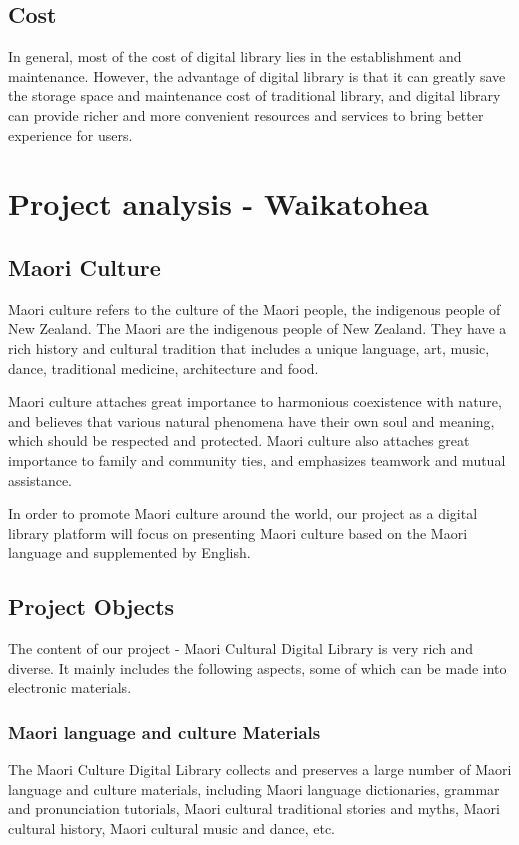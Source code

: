 \subsection{Cost}
In general, most of the cost of digital library lies in the establishment and maintenance. However, the advantage of digital library is that it can greatly save the storage space and maintenance cost of traditional library, and digital library can provide richer and more convenient resources and services to bring better experience for users.
 
\section{Project analysis - Waikatohea}
\subsection{Maori Culture}
Maori culture refers to the culture of the Maori people, the indigenous people of New Zealand. The Maori are the indigenous people of New Zealand. They have a rich history and cultural tradition that includes a unique language, art, music, dance, traditional medicine, architecture and food.

Maori culture attaches great importance to harmonious coexistence with nature, and believes that various natural phenomena have their own soul and meaning, which should be respected and protected. Maori culture also attaches great importance to family and community ties, and emphasizes teamwork and mutual assistance.

In order to promote Maori culture around the world, our project as a digital library platform will focus on presenting Maori culture based on the Maori language and supplemented by English.

\subsection{Project Objects}
The content of our project - Maori Cultural Digital Library is very rich and diverse. It mainly includes the following aspects, some of which can be made into electronic materials.

\subsubsection{Maori language and culture Materials}
The Maori Culture Digital Library collects and preserves a large number of Maori language and culture materials, including Maori language dictionaries, grammar and pronunciation tutorials, Maori cultural traditional stories and myths, Maori cultural history, Maori cultural music and dance, etc.


